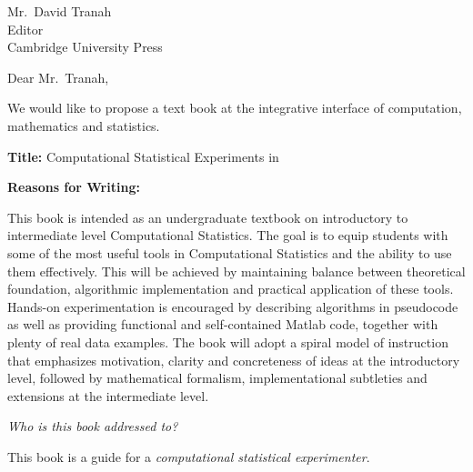\documentclass[a4paper]{letter}
\begin{document}

\address{
Dr.~Raazesh Sainudiin and\\				
Dr.~Dominic Lee\\
Laboratory for Mathematical Statistical Experiments and\\
Department of Mathematics and Statistics\\
University of Canterbury, Private Bag 4800\\
Christchurch, New Zealand\\
Telephone: +64-3-364 2987, Extn 7691\\
{\tt r.sainudiin@math.canterbury.ac.nz}%
}
\signature{Raazesh Sainudiin \qquad Dominic Lee}
\begin{letter}{}
{
Mr.~David Tranah\\
Editor\\
Cambridge University Press\\
}

\opening{Dear Mr.~Tranah,} 

We would like to propose a text book at the integrative interface of computation, mathematics and statistics.  

{\bf Title:} Computational Statistical Experiments in \Matlab

{\bf Reasons for Writing:} 

This book is intended as an undergraduate textbook on introductory to intermediate level Computational Statistics. 
The goal is to equip students with some of the most useful tools in Computational Statistics and the ability to use them effectively. 
This will be achieved by maintaining balance between theoretical foundation, algorithmic implementation and practical application of these tools. 
Hands-on experimentation is encouraged by describing algorithms in pseudocode as well as providing functional and self-contained Matlab code, together with plenty of real data examples. 
The book will adopt a spiral model of instruction that emphasizes motivation, clarity and concreteness of ideas at the introductory level, followed by mathematical formalism, implementational subtleties and extensions at the intermediate level.

{\em Who is this book addressed to?}

This book is a guide for a {\it computational statistical experimenter}.


\end{letter}
\end{document}
